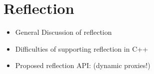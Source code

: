 \chapter{Reflection}

\begin{itemize}
 \item General Discussion of reflection
 \item Difficulties of supporting reflection in C++
 \item Proposed reflection API: (dynamic proxies!)
\end{itemize}
